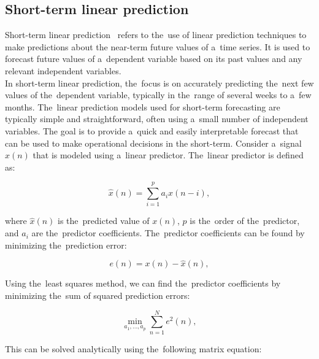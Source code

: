 \subsection{Short-term linear prediction} \label{subsec:shortlp}

Short-term linear prediction~\cite{Riahy} refers to the~use of linear prediction techniques to make predictions about
the near-term future values of a~time series. It is used to forecast future values of a~dependent variable based on
its past values and any relevant independent variables.
\\
In short-term linear prediction, the~focus is on accurately predicting the~next few values of the~dependent variable,
typically in the~range of several weeks to a~few months. The~linear prediction models used for short-term
forecasting are typically simple and straightforward, often using a~small number of independent variables.
The goal is to provide a~quick and easily interpretable forecast that can be used to make operational decisions in
the short-term.
Consider a~signal $x(n)$ that is modeled using a~linear predictor. The~linear predictor is defined as:

\begin{equation}
  \hat{x}(n) = \sum_{i=1}^{p} a_i x(n-i),
  \label{eq:linear-predictor}
\end{equation}

where $\hat{x}(n)$ is the~predicted value of $x(n)$, $p$ is the~order of the~predictor, and $a_i$ are the~predictor coefficients. The~predictor coefficients can be found by minimizing the~prediction error:

\begin{equation}
  e(n) = x(n) - \hat{x}(n),
  \label{eq:prediction-error}
\end{equation}

Using the~least squares method, we can find the~predictor coefficients by minimizing the~sum of squared prediction errors:

\begin{equation}
  \min_{a_1,\dots,a_p} \sum_{n=1}^{N} e^2(n),
  \label{eq:least-squares}
\end{equation}

This can be solved analytically using the~following matrix equation:

